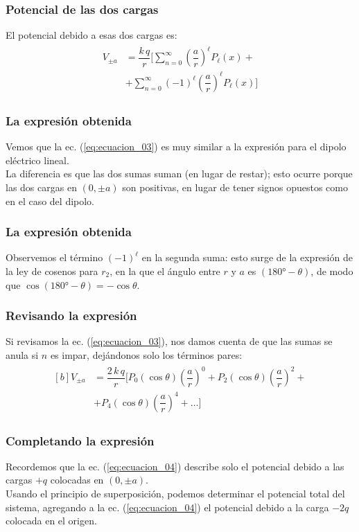 \documentclass[12pt]{beamer}
\begin{document}
\begin{frame}
\frametitle{Potencial de las dos cargas}
El potencial debido a esas dos cargas es:
\pause
\begin{align}
\begin{aligned}
V_{\pm a} &= \dfrac{k \, q}{r} \bigg[ \sum_{n=0}^{\infty} \left( \dfrac{a}{r} \right)^{\ell} P_{\ell}(x) + \\[0.5em]
&+ \sum_{n=0}^{\infty} (-1)^{\ell} \left( \dfrac{a}{r} \right)^{\ell} P_{\ell}(x) \bigg]
\end{aligned}
\label{eq:ecuacion_03}
\end{align}
\end{frame}
\begin{frame}
\frametitle{La expresión obtenida}
Vemos que la ec. (\ref{eq:ecuacion_03}) es muy similar a la expresión para el dipolo eléctrico lineal.
\\
\bigskip
\pause
La diferencia es que las dos sumas suman (en lugar de restar); esto ocurre porque las dos cargas en $(0, \pm a)$ son positivas, en lugar de tener signos opuestos como en el caso del dipolo.
\end{frame}
\begin{frame}
\frametitle{La expresión obtenida}
Observemos el término $(-1)^{\ell}$ en la segunda suma: esto surge de la expresión de la ley de cosenos para $r_{2}$, en la que el ángulo entre $r$ y $a$ es $(\ang{180} - \theta)$, de modo que $\cos (\ang{180} - \theta) = - \cos \theta$.
\end{frame}
\begin{frame}
\frametitle{Revisando la expresión}
Si revisamos la ec. (\ref{eq:ecuacion_03}), nos damos cuenta de que las sumas se anula si $n$ es impar, dejándonos solo los términos pares:
\begin{align}
\begin{aligned}[b]
V_{\pm a} &= \dfrac{2 \, k \, q}{r} \bigg[ P_{0} (\cos \theta)  \left( \dfrac{a}{r} \right)^{0} + P_{2} (\cos \theta) \left( \dfrac{a}{r} \right)^{2} + \\[0.5em]
&+ P_{4} (\cos \theta) \left( \dfrac{a}{r} \right)^{4} + \ldots \bigg]
\end{aligned}
\label{eq:ecuacion_04}
\end{align}
\end{frame}
\begin{frame}
\frametitle{Completando la expresión}
Recordemos que la ec. (\ref{eq:ecuacion_04}) describe solo el potencial debido a las cargas $+q$ colocadas en $(0, \pm a)$.
\\
\bigskip
\pause
Usando el principio de superposición, podemos determinar el potencial total del sistema, agregando a la ec. (\ref{eq:ecuacion_04}) el potencial debido a la carga $-2q$ colocada en el origen.
\end{frame}
\end{document}
